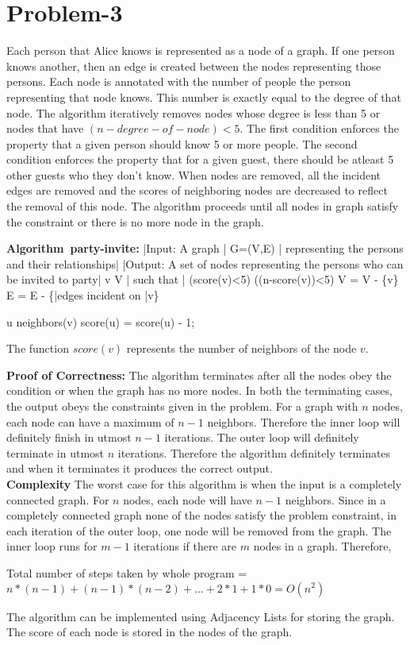 \documentclass{article}
\begin{document}
\section{Problem-3} 
Each person that Alice knows is represented as a node of a graph. If one person knows another, then an edge is created between the nodes representing those persons. Each node is annotated with the number of people the person representing that node knows. This number is exactly equal to the degree of that node. The algorithm iteratively removes nodes whose degree is less than 5 or nodes that have $(n - degree-of-node)<5$. The first condition enforces the property that a given person should know 5 or more people. The second condition enforces the property that for a given guest, there should be atleast 5 other guests who they don't know. When nodes are removed, all the incident edges are removed and the scores of neighboring nodes are decreased to reflect the removal of this node. The algorithm proceeds until all nodes in graph satisfy the constraint or there is no more node in the graph.

\begin{program}
\mbox{\textbf{Algorithm party-invite:}}
|Input: A graph | G=(V,E) | representing the persons and their relationships|
|Output: A set of nodes representing the persons who can be invited to party|
\BEGIN
	\FOR  v \in V | such that | (score(v)<5) \lor ((n-score(v))<5)\DO
		V = V - \{v\}
		E = E - \{|edges incident on |v\}

		\FOR  u \in neighbors(v) \DO
			score(u) = score(u) - 1;
		\OD
	\OD
\END
\end{program}

The function $score(v)$ represents the number of neighbors of the node $v$. 

\noindent \textbf{Proof of Correctness:}
The algorithm terminates after all the nodes obey the condition or when the graph has no more nodes. In both the terminating cases, the output obeys the constraints given in the problem. For a graph with $n$ nodes, each node can have a maximum of $n-1$ neighbors. Therefore the inner loop will definitely finish in utmost $n-1$ iterations. The outer loop will definitely terminate in utmost $n$ iterations. Therefore the algorithm definitely terminates and when it terminates it produces the correct output.
\ \\
\noindent \textbf{Complexity}
The worst case for this algorithm is when the input is a completely connected graph. For $n$ nodes, each node will have $n-1$ neighbors. Since in a completely connected graph none of the nodes satisfy the problem constraint, in each iteration of the outer loop, one node will be removed from the graph. The inner loop runs for $m-1$ iterations if there are $m$ nodes in a graph. Therefore,

Total number of steps taken by whole program = $n*(n-1) + (n-1)*(n - 2) + \ldots + 2*1 + 1*0 = O(n^{2})$

The algorithm can be implemented using Adjacency Lists for storing the graph. The score of each node is stored in the nodes of the graph. 
\end{document}
